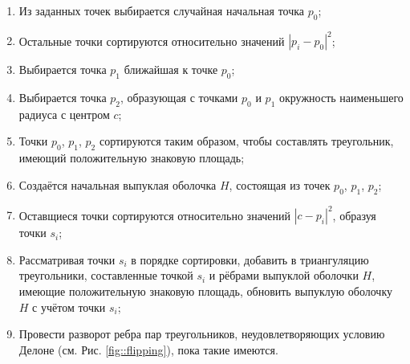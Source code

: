 \documentclass{fefu}
\begin{document}
            \begin{enumerate}
                \item Из заданных точек выбирается случайная начальная точка $p_0$;
                \item Остальные точки сортируются относительно значений $\left|p_i-p_0\right|^2$;
                \item Выбирается точка $p_1$ ближайшая к точке $p_0$;
                \item Выбирается точка $p_2$, образующая с точками $p_0$ и $p_1$ окружность наименьшего радиуса с центром $c$;
                \item Точки $p_0$, $p_1$, $p_2$ сортируются таким образом, чтобы составлять треугольник, имеющий положительную знаковую площадь;
                \item Создаётся начальная выпуклая оболочка $H$, состоящая из точек $p_0$, $p_1$, $p_2$;
                \item Оставщиеся точки сортируются относительно значений $\left|c-p_i\right|^2$, образуя точки $s_i$;
                \item Рассматривая точки $s_i$ в порядке сортировки, добавить в триангуляцию треугольники, составленные точкой $s_i$ и рёбрами выпуклой оболочки $H$, имеющие положительную знаковую площадь, обновить выпуклую оболочку $H$ с учётом точки $s_i$;
                \item Провести разворот ребра пар треугольников, неудовлетворяющих условию Делоне (см. Рис. \ref{fig::flipping}), пока такие имеются.
            \end{enumerate}
\end{document}
